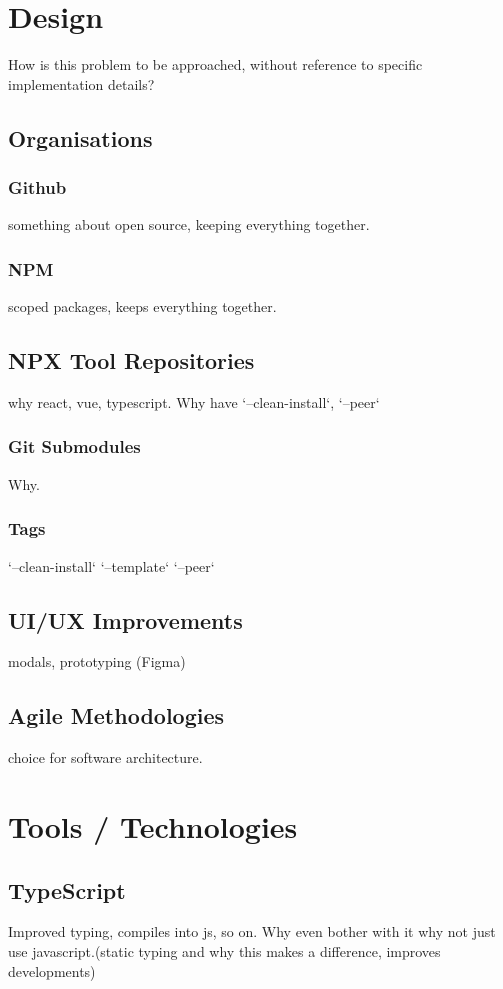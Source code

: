 \documentclass{l4proj}
\begin{document}
\chapter{Design}
How is this problem to be approached, without reference to specific implementation details? 
\section{Organisations}
\subsection{Github}
\text something about open source, keeping everything together.
\subsection{NPM}
\text scoped packages, keeps everything together.
\section{NPX Tool Repositories}
\text why react, vue, typescript. Why have `--clean-install`, `--peer`
\subsection{Git Submodules}
\text Why.
\subsection{Tags}
\text `--clean-install` `--template` `--peer`
\section{UI/UX Improvements}
\text modals, prototyping (Figma)
\section{Agile Methodologies}
\text choice for software architecture.
\chapter{Tools / Technologies}

\section{TypeScript}
\text Improved typing, compiles into js, so on. Why even bother with it why not just use javascript.(static typing and why this makes a difference, improves developments)
\end{document}
